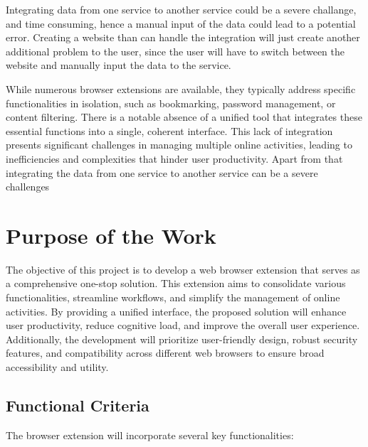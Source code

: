 Integrating data from one service to another service could be a severe challange, and time consuming, hence a manual input of the data could lead to a potential error. Creating a website than can handle the integration will just create another additional problem to the user, since the user will have to switch between the website and manually input the data to the service.

While numerous browser extensions are available, they typically address specific functionalities in isolation, such as bookmarking, password management, or content filtering. There is a notable absence of a unified tool that integrates these essential functions into a single, coherent interface. This lack of integration presents significant challenges in managing multiple online activities, leading to inefficiencies and complexities that hinder user productivity. Apart from that integrating the data from one service to another service can be a severe challenges

%
%
\section{Purpose of the Work}
\label{sec:intro:goal}

The objective of this project is to develop a web browser extension that serves as a comprehensive one-stop solution. This extension aims to consolidate various functionalities, streamline workflows, and simplify the management of online activities. By providing a unified interface, the proposed solution will enhance user productivity, reduce cognitive load, and improve the overall user experience. Additionally, the development will prioritize user-friendly design, robust security features, and compatibility across different web browsers to ensure broad accessibility and utility.

\subsection{Functional Criteria}
The browser extension will incorporate several key functionalities:

